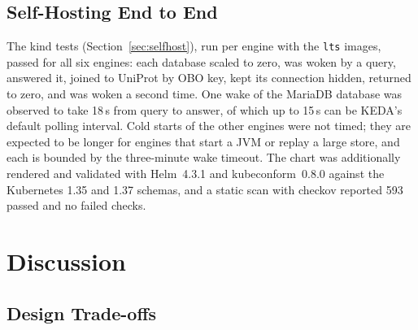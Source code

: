 \documentclass[sigconf,nonacm]{acmart}
\begin{document}
\subsection{Self-Hosting End to End}

The kind tests (Section~\ref{sec:selfhost}), run per engine with the
\texttt{lts} images, passed for all six engines: each database scaled to zero, was woken by a query,
answered it, joined to UniProt by OBO key, kept its connection hidden,
returned to zero, and was woken a second time.  One wake of the MariaDB
database was observed to take 18\,s from query to answer, of which up to
15\,s can be KEDA's default polling interval.  Cold starts of the other
engines were not timed; they are expected to be longer for engines that
start a JVM or replay a large store, and each is bounded by the
three-minute wake timeout.  The chart was additionally rendered and
validated with Helm~4.3.1 and kubeconform~0.8.0 against the Kubernetes
1.35 and 1.37 schemas, and a static scan with checkov reported 593
passed and no failed checks.

\section{Discussion}
\label{sec:discussion}

\subsection{Design Trade-offs}
\end{document}
